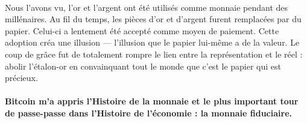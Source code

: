 \paragraph{}
Nous l'avons vu, l'or et l'argent ont été utilisés comme monnaie pendant des
millénaires. Au fil du temps, les pièces d'or et d'argent furent remplacées par
du papier. Celui-ci a lentement été accepté comme moyen de paiement. Cette
adoption créa une illusion --- l'illusion que le papier lui-même a de la valeur.
Le coup de grâce fut de totalement rompre le lien entre la représentation et le
réel : abolir l'étalon-or en convainquant tout le monde que c'est le papier qui
est précieux.

\paragraph{Bitcoin m'a appris l'Histoire de la monnaie et le plus important tour
de passe-passe dans l'Histoire de l'économie : la monnaie fiduciaire.}

%
%
%
%
